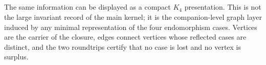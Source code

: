 \documentclass[11pt]{article}
\begin{document}
\begin{code}
\AgdaSpace{}%
\AgdaSpace{}%
\<%
\\
\>[0]\AgdaSpace{}%
\AgdaSymbol{|}\AgdaSpace{}%
\AgdaSpace{}%
\AgdaOperator{\AgdaInductiveConstructor{,}}\AgdaSpace{}%
\AgdaSpace{}%
\AgdaSymbol{=}\AgdaSpace{}%
\AgdaSpace{}%
\AgdaSymbol{(}\AgdaSpace{}%
\AgdaSymbol{(}\AgdaSpace{}%
\AgdaSpace{}%
\AgdaSymbol{))}\AgdaSpace{}%
\<%
\\
\>[0][@{}l@{\AgdaIndent{0}}]%
\>[2]\<%
\\
\>[2][@{}l@{\AgdaIndent{0}}]%
\>[4]\AgdaSpace{}%
\AgdaSymbol{=}\AgdaSpace{}%
\AgdaSpace{}%
\<%
\\
%
\>[4]\AgdaSpace{}%
\AgdaSymbol{=}\AgdaSpace{}%
\AgdaSpace{}%
\<%
\\
%
\>[4]\AgdaSpace{}%
\AgdaSymbol{=}\AgdaSpace{}%
\AgdaSpace{}%
\<%
\\
%
\>[4]\AgdaSpace{}%
\AgdaSymbol{=}\AgdaSpace{}%
\AgdaSpace{}%
\<%
\\
%
\\[\AgdaEmptyExtraSkip]%
%
\>[4]\AgdaSpace{}%
\AgdaSymbol{:}\AgdaSpace{}%
\AgdaSpace{}%
\AgdaSpace{}%
\AgdaSpace{}%
\<%
\\
%
\>[4]\AgdaSpace{}%
\AgdaSymbol{=}\AgdaSpace{}%
\AgdaSpace{}%
\AgdaSymbol{(}\AgdaSpace{}%
\AgdaSymbol{(}\AgdaSpace{}%
\AgdaSymbol{))}\AgdaSpace{}%
\AgdaSymbol{(}\AgdaSpace{}%
\AgdaSpace{}%
\AgdaSymbol{)}\<%
\end{code}

The same information can be displayed as a compact $K_4$ presentation.
This is not the large invariant record of the main kernel; it is the
companion-level graph layer induced by any minimal representation of the
four endomorphism cases.  Vertices are the carrier of the closure,
edges connect vertices whose reflected cases are distinct, and the two
roundtrips certify that no case is lost and no vertex is surplus.
\end{document}
